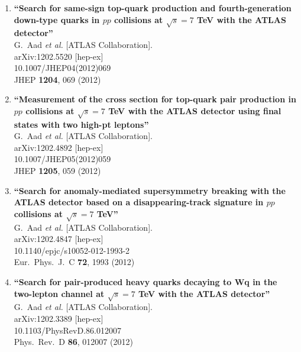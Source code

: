 \documentclass{article}
\begin{document}
\begin{enumerate}
\item%
{\bf ``Search for same-sign top-quark production and fourth-generation down-type quarks in $pp$ collisions at $\sqrt{s}=7$ TeV with the ATLAS detector''}
  \\{}G.~Aad {\it et al.}  [ATLAS Collaboration].
  \\{}arXiv:1202.5520 [hep-ex]
    \\{}10.1007/JHEP04(2012)069
\\{}JHEP {\bf 1204}, 069 (2012) %


\item%
{\bf ``Measurement of the cross section for top-quark pair production in $pp$ collisions at $\sqrt{s}=7$ TeV with the ATLAS detector using final states with two high-pt leptons''}
  \\{}G.~Aad {\it et al.}  [ATLAS Collaboration].
  \\{}arXiv:1202.4892 [hep-ex]
    \\{}10.1007/JHEP05(2012)059
\\{}JHEP {\bf 1205}, 059 (2012) %


\item%
{\bf ``Search for anomaly-mediated supersymmetry breaking with the ATLAS detector based on a disappearing-track signature in $pp$ collisions at $\sqrt{s}=7$ TeV''}
  \\{}G.~Aad {\it et al.}  [ATLAS Collaboration].
  \\{}arXiv:1202.4847 [hep-ex]
    \\{}10.1140/epjc/s10052-012-1993-2
\\{}Eur.\ Phys.\ J.\ C {\bf 72}, 1993 (2012) %


\item%
{\bf ``Search for pair-produced heavy quarks decaying to Wq in the two-lepton channel at $\sqrt{s}=7$ TeV with the ATLAS detector''}
  \\{}G.~Aad {\it et al.}  [ATLAS Collaboration].
  \\{}arXiv:1202.3389 [hep-ex]
    \\{}10.1103/PhysRevD.86.012007
\\{}Phys.\ Rev.\ D {\bf 86}, 012007 (2012) %



\end{enumerate}
\end{document}
